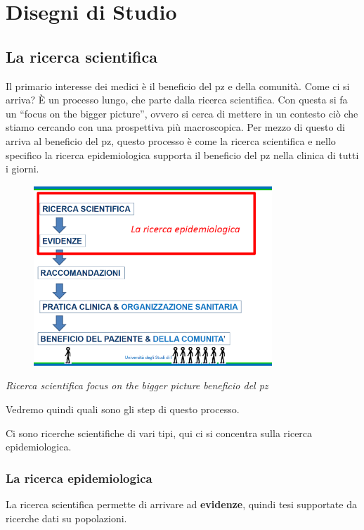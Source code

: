 
\section{Disegni di Studio}

\subsection{La ricerca scientifica}


Il primario interesse dei medici è il beneficio del pz e della comunità.
Come ci si arriva? È un processo lungo, che parte dalla ricerca
scientifica. Con questa si fa un ``focus on the bigger picture'', ovvero
si cerca di mettere in un contesto ciò che stiamo cercando con una
prospettiva più macroscopica. Per mezzo di questo di arriva al beneficio
del pz, questo processo è come la ricerca scientifica e nello specifico
la ricerca epidemiologica supporta il beneficio del pz nella clinica di
tutti i giorni.
\begin{figure}[!ht]
\centering
	\includegraphics[width=0.8\textwidth]{04/image1.png}
	\end{figure}




\emph{Ricerca scientifica focus on the bigger picture beneficio del pz}

Vedremo quindi quali sono gli step di questo processo.

Ci sono ricerche scientifiche di vari tipi, qui ci si concentra sulla
ricerca epidemiologica.

\subsubsection{La ricerca epidemiologica}

La ricerca scientifica permette di arrivare ad \textbf{evidenze}, quindi
tesi supportate da ricerche dati su popolazioni.


